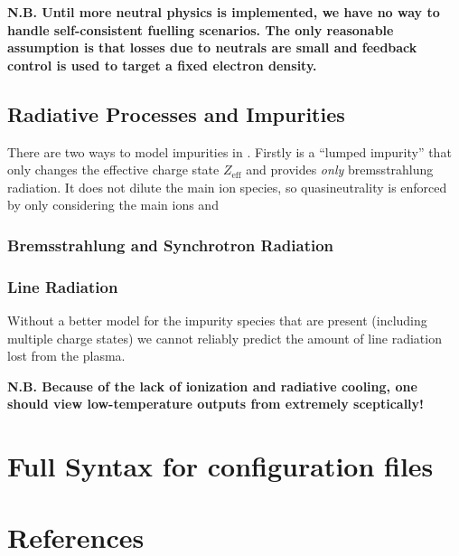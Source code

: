 \documentclass{revtex4}
\begin{document}
\textbf{N.B. Until more neutral physics is implemented, we have no way to handle self-consistent fuelling scenarios. The only reasonable assumption
	is that losses due to neutrals are small and feedback control is used to target a fixed electron density.}

\subsection{Radiative Processes and Impurities}
There are two ways to model impurities in \mctrans{}. Firstly is a ``lumped impurity'' that only changes the effective charge state $Z_{\mathrm{eff}}$ and 
provides \textit{only} bremsstrahlung radiation. It does not dilute the main ion species, so quasineutrality is enforced by only considering the main ions and 

\subsubsection{Bremsstrahlung and Synchrotron Radiation}
\subsubsection{Line Radiation}
 Without a better model for the impurity 
species that are present (including multiple charge states) we cannot reliably predict the amount of line radiation lost from the plasma.

\textbf{N.B. Because of the lack of ionization and radiative cooling, one should view low-temperature outputs from \mctrans{} extremely sceptically!}


\appendix
\section{Full Syntax for \mctrans{} configuration files}
\section{References}


\end{document}
